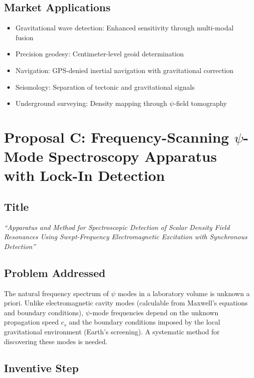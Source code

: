 \documentclass[11pt,a4paper]{article}
\begin{document}
\subsection{Market Applications}

\begin{itemize}[nosep]
\item Gravitational wave detection: Enhanced sensitivity through
multi-modal fusion
\item Precision geodesy: Centimeter-level geoid determination
\item Navigation: GPS-denied inertial navigation with
gravitational correction
\item Seismology: Separation of tectonic and gravitational
signals
\item Underground surveying: Density mapping through
$\psi$-field tomography
\end{itemize}

\section{Proposal C: Frequency-Scanning $\psi$-Mode Spectroscopy
Apparatus with Lock-In Detection}

\subsection{Title}

\textit{``Apparatus and Method for Spectroscopic Detection of
Scalar Density Field Resonances Using Swept-Frequency
Electromagnetic Excitation with Synchronous Detection''}

\subsection{Problem Addressed}

The natural frequency spectrum of $\psi$ modes in a laboratory
volume is unknown a priori.  Unlike electromagnetic cavity modes
(calculable from Maxwell's equations and boundary conditions),
$\psi$-mode frequencies depend on the unknown propagation speed
$c_s$ and the boundary conditions imposed by the local
gravitational environment (Earth's screening).  A systematic
method for discovering these modes is needed.

\subsection{Inventive Step}
\end{document}
